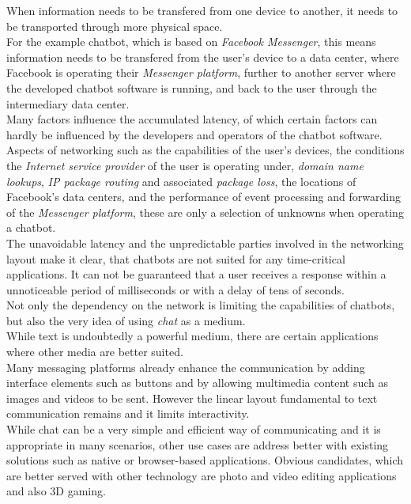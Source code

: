 When information needs to be transfered from one device to another,
it needs to be transported through more physical space.
\\
For the example chatbot, which is based on \emph{Facebook Messenger},
this means information needs to be transfered from the user's device to a data center,
where Facebook is operating their \emph{Messenger platform},
further to another server where the developed chatbot software is running,
and back to the user through the intermediary data center.
\\
Many factors influence the accumulated latency,
of which certain factors can hardly be influenced by the developers and operators of the chatbot software.
\\
Aspects of networking such as the capabilities of the user's devices,
the conditions the \emph{Internet service provider} of the user is operating under,
\emph{domain name lookups},
\emph{IP package routing} and associated \emph{package loss},
the locations of Facebook's data centers,
and the performance of event processing and forwarding of the \emph{Messenger platform},
these are only a selection of unknowns when operating a chatbot.
\\
The unavoidable latency and the unpredictable parties involved in the networking layout
make it clear, that chatbots are not suited for any time-critical applications.
It can not be guaranteed that a user receives a response within a unnoticeable period of milliseconds or with a delay of tens of seconds.
\\

Not only the dependency on the network is limiting the capabilities of chatbots,
but also the very idea of using \emph{chat} as a medium.
\\
While text is undoubtedly a powerful medium,
there are certain applications where other media are better suited.
\\
Many messaging platforms already enhance the communication by adding interface elements such as buttons
and by allowing multimedia content such as images and videos to be sent.
However the linear layout fundamental to text communication remains and it limits interactivity.
\\
While chat can be a very simple and efficient way of communicating and it is appropriate in many scenarios,
other use cases are address better with existing solutions such as native or browser-based applications.
Obvious candidates, which are better served with other technology are photo and video editing applications
and also 3D gaming.
\\

